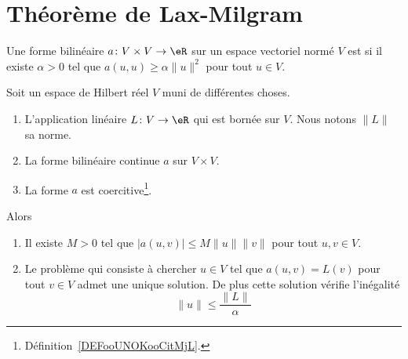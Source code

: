 \section{Théorème de Lax-Milgram}

\begin{definition}      \label{DEFooUNOKooCitMjL}
	Une forme bilinéaire \( a\colon V\times V\to \eR\) sur un espace vectoriel normé \( V\) est  si il existe \( \alpha>0\) tel que \(  a(u,u)\geq \alpha\| u \|^2 \) pour tout \( u\in V\).
\end{definition}

\begin{theorem}       \label{THOooLLUXooHyqmVL}
	Soit un espace de Hilbert réel \( V\) muni de différentes choses.
	\begin{enumerate}
		\item
		      L'application linéaire \( L\colon V\to \eR\) qui est bornée sur \( V\). Nous notons \( \| L \|\) sa norme.
		\item
		      La forme bilinéaire continue \( a\) sur \( V\times V\).
		\item
		      La forme \( a\) est coercitive\footnote{Définition~\ref{DEFooUNOKooCitMjL}.}.
	\end{enumerate}
	Alors
	\begin{enumerate}
		\item
		      Il existe \( M>0\) tel que \( | a(u,v) |\leq M\| u \|\| v \|\) pour tout \( u,v\in V\).
		\item
		      Le problème qui consiste à chercher \( u\in V\) tel que \( a(u,v)=L(v)\) pour tout \( v\in V\) admet une unique solution. De plus cette solution vérifie l'inégalité
		      \begin{equation}        \label{EQooUAYSooKYyQBU}
			      \| u \|\leq \frac{ \| L \| }{ \alpha }
		      \end{equation}
	\end{enumerate}
\end{theorem}

